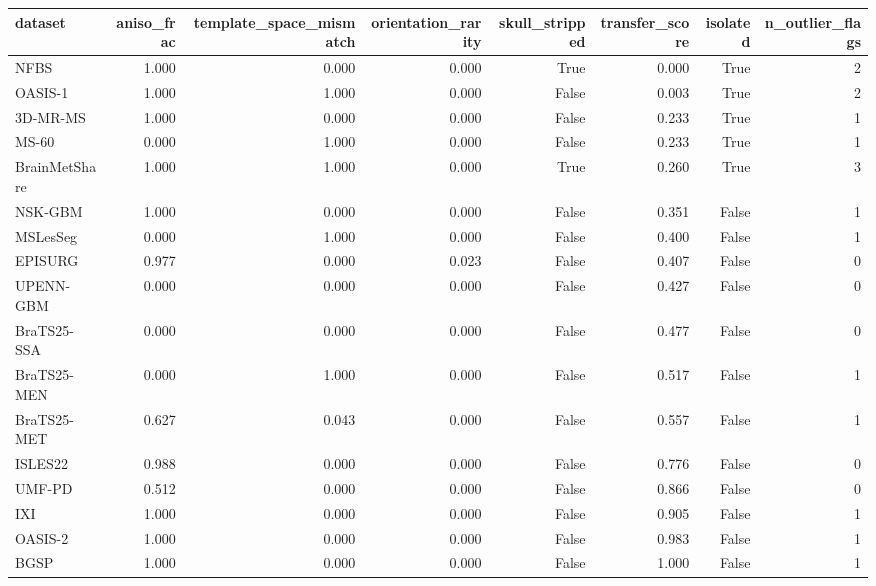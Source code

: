 \begin{tabular}{lrrrrrrr}
\toprule
dataset & aniso\_frac & template\_space\_mismatch & orientation\_rarity & skull\_stripped & transfer\_score & isolated & n\_outlier\_flags \\
\midrule
NFBS & 1.000 & 0.000 & 0.000 & True & 0.000 & True & 2 \\
OASIS-1 & 1.000 & 1.000 & 0.000 & False & 0.003 & True & 2 \\
3D-MR-MS & 1.000 & 0.000 & 0.000 & False & 0.233 & True & 1 \\
MS-60 & 0.000 & 1.000 & 0.000 & False & 0.233 & True & 1 \\
BrainMetShare & 1.000 & 1.000 & 0.000 & True & 0.260 & True & 3 \\
NSK-GBM & 1.000 & 0.000 & 0.000 & False & 0.351 & False & 1 \\
MSLesSeg & 0.000 & 1.000 & 0.000 & False & 0.400 & False & 1 \\
EPISURG & 0.977 & 0.000 & 0.023 & False & 0.407 & False & 0 \\
UPENN-GBM & 0.000 & 0.000 & 0.000 & False & 0.427 & False & 0 \\
BraTS25-SSA & 0.000 & 0.000 & 0.000 & False & 0.477 & False & 0 \\
BraTS25-MEN & 0.000 & 1.000 & 0.000 & False & 0.517 & False & 1 \\
BraTS25-MET & 0.627 & 0.043 & 0.000 & False & 0.557 & False & 1 \\
ISLES22 & 0.988 & 0.000 & 0.000 & False & 0.776 & False & 0 \\
UMF-PD & 0.512 & 0.000 & 0.000 & False & 0.866 & False & 0 \\
IXI & 1.000 & 0.000 & 0.000 & False & 0.905 & False & 1 \\
OASIS-2 & 1.000 & 0.000 & 0.000 & False & 0.983 & False & 1 \\
BGSP & 1.000 & 0.000 & 0.000 & False & 1.000 & False & 1 \\
\bottomrule
\end{tabular}
